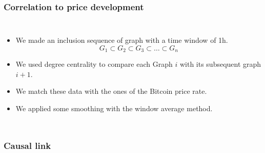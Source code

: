 \documentclass[aspectratio=169]{beamer}
\begin{document}
\begin{frame}[t]
    \frametitle{Correlation to price development}
    \begin{columns}
\begin{itemize}
    \item We made an inclusion sequence of graph with a time window of 1h.
        $$G_1\subset G_2\subset G_3\subset \ldots\subset G_n$$
    \item We used degree centrality to compare each Graph $i$ with its subsequent graph $i+1$.
    \item We match these data with the ones of the Bitcoin price rate.
    \item We applied some smoothing with the window average method.
\end{itemize}
    \end{columns}
\end{frame}
\begin{frame}[t]
    \frametitle{Causal link}
\end{frame}
\end{document}
